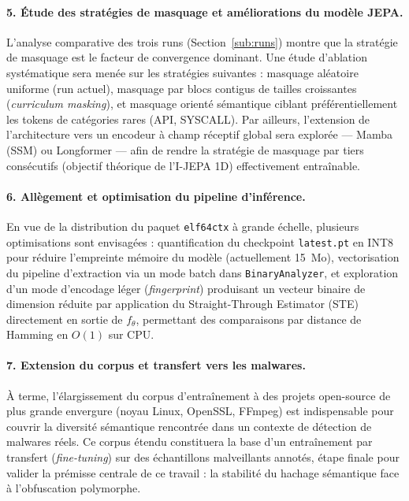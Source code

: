 \paragraph{5. Étude des stratégies de masquage et améliorations du modèle JEPA.}
L'analyse comparative des trois runs (Section~\ref{sub:runs}) montre que la
stratégie de masquage est le facteur de convergence dominant. Une étude d'ablation
systématique sera menée sur les stratégies suivantes : masquage aléatoire uniforme
(run actuel), masquage par blocs contigus de tailles croissantes (\textit{curriculum
masking}), et masquage orienté sémantique ciblant préférentiellement les tokens de
catégories rares (API, SYSCALL). Par ailleurs, l'extension de l'architecture vers un
encodeur à champ réceptif global sera explorée — Mamba (SSM) ou Longformer — afin de
rendre la stratégie de masquage par tiers consécutifs (objectif théorique de l'I-JEPA
1D) effectivement entraînable.

\paragraph{6. Allègement et optimisation du pipeline d'inférence.}
En vue de la distribution du paquet \texttt{elf64ctx} à grande échelle, plusieurs
optimisations sont envisagées : quantification du checkpoint \texttt{latest.pt} en
INT8 pour réduire l'empreinte mémoire du modèle (actuellement 15~Mo), vectorisation
du pipeline d'extraction via un mode batch dans \texttt{BinaryAnalyzer}, et exploration
d'un mode d'encodage léger (\textit{fingerprint}) produisant un vecteur binaire de
dimension réduite par application du Straight-Through Estimator (STE) directement en
sortie de $f_\theta$, permettant des comparaisons par distance de Hamming en $O(1)$
sur CPU.

\paragraph{7. Extension du corpus et transfert vers les malwares.}
À terme, l'élargissement du corpus d'entraînement à des projets open-source de plus
grande envergure (noyau Linux, OpenSSL, FFmpeg) est indispensable pour couvrir la
diversité sémantique rencontrée dans un contexte de détection de malwares réels. Ce
corpus étendu constituera la base d'un entraînement par transfert (\textit{fine-tuning})
sur des échantillons malveillants annotés, étape finale pour valider la prémisse centrale
de ce travail : la stabilité du hachage sémantique face à l'obfuscation polymorphe.
